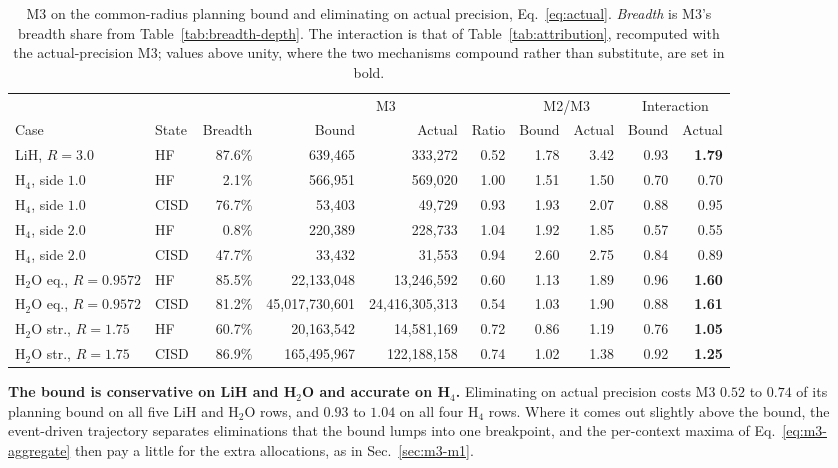 \documentclass[10pt]{article}
\begin{document}
\begin{table}[!htbp]
\centering
\scriptsize
\caption{M3 on the common-radius planning bound and eliminating on actual precision, Eq.~\eqref{eq:actual}. \emph{Breadth} is M3's breadth share from Table~\ref{tab:breadth-depth}. The interaction is that of Table~\ref{tab:attribution}, recomputed with the actual-precision M3; values above unity, where the two mechanisms compound rather than substitute, are set in bold.}
\label{tab:spillover}
\begin{tabular}{llrrrrrrrr}
\toprule
 & & & \multicolumn{3}{c}{M3} & \multicolumn{2}{c}{M2/M3} & \multicolumn{2}{c}{Interaction} \\
\cmidrule(lr){4-6}\cmidrule(lr){7-8}\cmidrule(lr){9-10}
Case & State & Breadth & Bound & Actual & Ratio & Bound & Actual & Bound & Actual \\
\midrule
LiH, $R{=}3.0$ & HF & 87.6\% & 639,465 & 333,272 & 0.52 & 1.78 & 3.42 & 0.93 & \textbf{1.79} \\
H$_4$, side $1.0$ & HF & 2.1\% & 566,951 & 569,020 & 1.00 & 1.51 & 1.50 & 0.70 & 0.70 \\
H$_4$, side $1.0$ & CISD & 76.7\% & 53,403 & 49,729 & 0.93 & 1.93 & 2.07 & 0.88 & 0.95 \\
H$_4$, side $2.0$ & HF & 0.8\% & 220,389 & 228,733 & 1.04 & 1.92 & 1.85 & 0.57 & 0.55 \\
H$_4$, side $2.0$ & CISD & 47.7\% & 33,432 & 31,553 & 0.94 & 2.60 & 2.75 & 0.84 & 0.89 \\
H$_2$O eq., $R{=}0.9572$ & HF & 85.5\% & 22,133,048 & 13,246,592 & 0.60 & 1.13 & 1.89 & 0.96 & \textbf{1.60} \\
H$_2$O eq., $R{=}0.9572$ & CISD & 81.2\% & 45,017,730,601 & 24,416,305,313 & 0.54 & 1.03 & 1.90 & 0.88 & \textbf{1.61} \\
H$_2$O str., $R{=}1.75$ & HF & 60.7\% & 20,163,542 & 14,581,169 & 0.72 & 0.86 & 1.19 & 0.76 & \textbf{1.05} \\
H$_2$O str., $R{=}1.75$ & CISD & 86.9\% & 165,495,967 & 122,188,158 & 0.74 & 1.02 & 1.38 & 0.92 & \textbf{1.25} \\
\bottomrule
\end{tabular}
\end{table}

\textbf{The bound is conservative on LiH and H$_2$O and accurate on H$_4$.}
Eliminating on actual precision costs M3 $0.52$ to $0.74$ of its planning bound on
all five LiH and H$_2$O rows, and $0.93$ to $1.04$ on all four H$_4$ rows. Where it
comes out slightly above the bound, the event-driven trajectory separates
eliminations that the bound lumps into one breakpoint, and the per-context maxima
of Eq.~\eqref{eq:m3-aggregate} then pay a little for the extra allocations, as in
Sec.~\ref{sec:m3-m1}.
\end{document}
